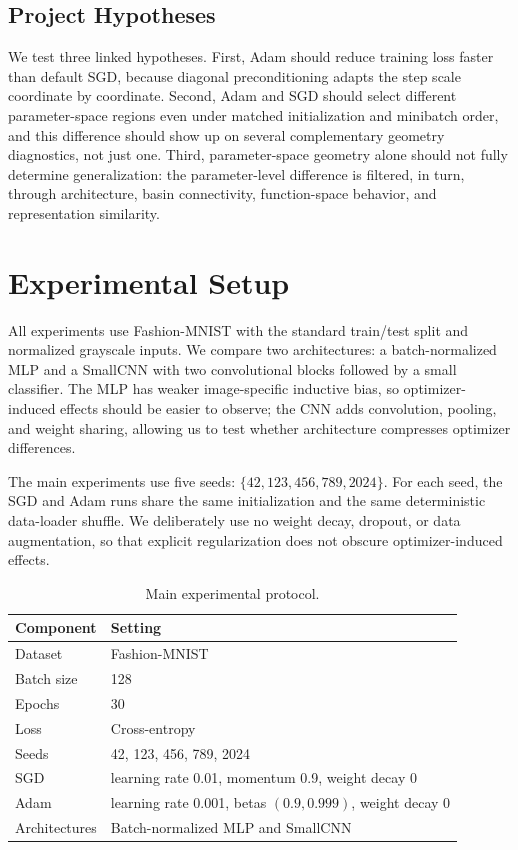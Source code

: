 \documentclass[11pt]{article}
\begin{document}
\subsection{Project Hypotheses}

We test three linked hypotheses. First, Adam should reduce training loss faster than default SGD, because diagonal preconditioning adapts the step scale coordinate by coordinate. Second, Adam and SGD should select different parameter-space regions even under matched initialization and minibatch order, and this difference should show up on several complementary geometry diagnostics, not just one. Third, parameter-space geometry alone should not fully determine generalization: the parameter-level difference is filtered, in turn, through architecture, basin connectivity, function-space behavior, and representation similarity.

\section{Experimental Setup}
\label{sec:setup}

All experiments use Fashion-MNIST with the standard train/test split and normalized grayscale inputs. We compare two architectures: a batch-normalized MLP and a SmallCNN with two convolutional blocks followed by a small classifier. The MLP has weaker image-specific inductive bias, so optimizer-induced effects should be easier to observe; the CNN adds convolution, pooling, and weight sharing, allowing us to test whether architecture compresses optimizer differences.

The main experiments use five seeds: $\{42,123,456,789,2024\}$. For each seed, the SGD and Adam runs share the same initialization and the same deterministic data-loader shuffle. We deliberately use no weight decay, dropout, or data augmentation, so that explicit regularization does not obscure optimizer-induced effects.

\begin{table}[H]
\centering
\begin{tabular}{ll}
\toprule
\textbf{Component} & \textbf{Setting}\\
\midrule
Dataset & Fashion-MNIST\\
Batch size & 128\\
Epochs & 30\\
Loss & Cross-entropy\\
Seeds & 42, 123, 456, 789, 2024\\
SGD & learning rate 0.01, momentum 0.9, weight decay 0\\
Adam & learning rate 0.001, betas $(0.9,0.999)$, weight decay 0\\
Architectures & Batch-normalized MLP and SmallCNN\\
\bottomrule
\end{tabular}
\caption{Main experimental protocol.}
\label{tab:setup}
\end{table}
\end{document}
